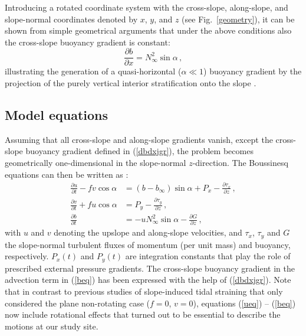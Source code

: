Introducing a rotated coordinate system with the cross-slope,
along-slope, and slope-normal coordinates denoted by $x$, $y$, and $z$
(see Fig.\ \ref{geometry}), it can be shown from simple geometrical
arguments that under the above conditions also the cross-slope
buoyancy gradient is constant:
\begin{equation}
  \label{dbdxjgr}
  \frac{\partial b}{\partial x} = N^2_\infty \sin \alpha \, ,
\end{equation}
illustrating the generation of a quasi-horizontal ($\alpha \ll 1$)
buoyancy gradient by the projection of the purely vertical interior
stratification onto the slope
\citep{Garrettetal93a,UmlaufBurchard2011a}.

\subsection{Model equations}\label{modelequations}

Assuming that all cross-slope and along-slope gradients vanish, except
the cross-slope buoyancy gradient defined in (\ref{dbdxjgr}), the problem
becomes geometrically one-dimensional in the slope-normal
$z$-direction. The Boussinesq equations can then be written as
\citep{Umlaufetal2015a}:
\begin{align}
  \label{ueq}
  \frac{\partial u}{ \partial t} -fv \cos \alpha  &= (b - b_\infty) \sin \alpha 
+ P_x - \frac{\partial \tau_x}{ \partial z} \, , \\
  \label{veq}
  \frac{ \partial v}{\partial t} + fu \cos \alpha &= P_y - 
\frac{\partial \tau_y}{\partial z}                             \, , \\
  \label{beq}  
  \frac{\partial b}{\partial t} &= -u N^2_\infty \sin \alpha - 
\frac{\partial G}{\partial z}                              \, , 
\end{align}
with $u$ and $v$ denoting the upslope and along-slope velocities, and
$\tau_x$, $\tau_y$ and $G$ the slope-normal turbulent fluxes of
momentum (per unit mass) and buoyancy, respectively. $P_x(t)$ and
$P_y(t)$ are integration constants that play the role of prescribed
external pressure gradients. The cross-slope buoyancy gradient in the
advection term in (\ref{beq}) has been expressed with the help of
(\ref{dbdxjgr}). Note that in contrast to previous studies of
slope-induced tidal straining that only considered the plane
non-rotating case ($f=0$, $v=0$), equations (\ref{ueq}) -- (\ref {beq}) now
include rotational effects that turned out to be essential to describe
the motions at our study site.


